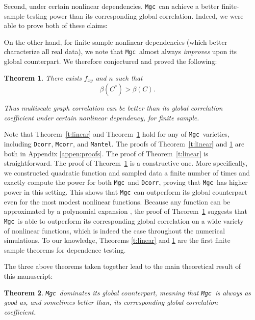 \documentclass[11pt]{article}
\newcommand{\note}[2][]{\added[#1,remark={#2}]{}}
\providecommand{\sct}[1]{{\sc \texttt{#1}}}
\newcommand{\G}{C}
\newcommand{\Mgc}{\sct{Mgc}}
\newcommand{\Dcorr}{\sct{Dcorr}}
\newcommand{\Mcorr}{\sct{Mcorr}}
\newcommand{\Mantel}{\sct{Mantel}}
\newcommand{\cs}[1]{{\note{cs: #1}}}
\newtheorem{thm}{Theorem}
\begin{document}
Second, under certain nonlinear dependencies, \Mgc~can achieve a better finite-sample testing power than its corresponding global correlation. Indeed, we were able to prove both of these claims:


On the other hand, for finite sample nonlinear dependencies (which better characterize all real data), we note that \Mgc~almost always \emph{improves} upon its global counterpart.  We therefore conjectured and proved the following:
\begin{thm}
\label{t:non}
There exists $f_{xy}$ and $n$ such that
\begin{equation}
\beta(\G^{*}) > \beta(\G).
\end{equation}

Thus multiscale graph correlation can be better than its global correlation coefficient under certain nonlinear dependency, for finite sample.
\end{thm}
Note that Theorem~\ref{t:linear} and Theorem~\ref{t:non} hold for any of \Mgc~varieties, including  \Dcorr, \Mcorr, and \Mantel.
%
The proofs of Theorem~\ref{t:linear} and \ref{t:non} are both in Appendix \ref{appen:proofs}.  The proof of Theorem~\ref{t:linear} is straightforward.  The proof of Theorem~\ref{t:non} is a constructive one. More specifically, we constructed quadratic function and sampled data a finite number of times and exactly compute the power for both \Mgc~and \Dcorr, proving that \Mgc~has higher power in this setting. This shows that \Mgc~can outperform its global counterpart even for the most modest nonlinear functions.  Because any function can be approximated by a polynomial expansion \cite{RudinBook}, the proof of Theorem~\ref{t:non} suggests that \Mgc~is able to outperform its corresponding global correlation on a wide variety of nonlinear functions, which is indeed the case throughout the numerical simulations. To our knowledge, Theorems \ref{t:linear} and \ref{t:non} are the first finite sample theorems for dependence testing.
\cs{is that true?}

The three above theorems taken together lead to the main theoretical result of this manuscript:
\begin{thm}
\Mgc~dominates its global counterpart, meaning that \Mgc~is always as good as, and sometimes better than, its corresponding global correlation coefficient. 
\end{thm}


\end{document}
